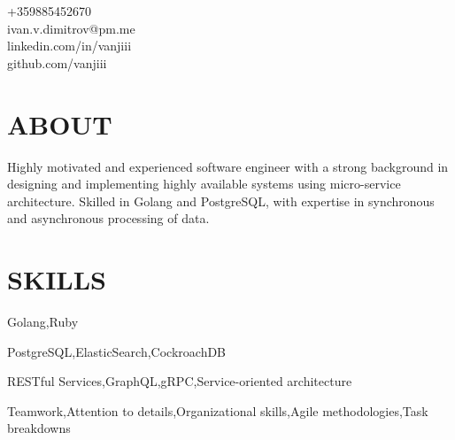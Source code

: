 \documentclass[margin,line]{resume}
\begin{document}
{
    \hfill +359885452670		\vspace{0mm}\\\vspace{0mm}%
    \hfill ivan.v.dimitrov@pm.me        \vspace{0mm}\\\vspace{0mm}%
    \hfill linkedin.com/in/vanjiii      \vspace{0mm}\\\vspace{0mm}%
    \hfill github.com/vanjiii		\vspace{0mm}\\\vspace{-10mm}%
}

\begin{resume}
\vspace{1mm}

\section{\mysidestyle\textbf{\large{A}\small{BOUT}}}

	Highly motivated and experienced software engineer with a strong background
	in designing and implementing highly available systems using micro-service
	architecture. Skilled in Golang and PostgreSQL, with expertise in
	synchronous and asynchronous processing of data.

\sectionline%

    \section{\mysidestyle\textbf{\large{S}\small{KILLS}}}

    \begin{list2}
      \item Golang,\hspace{2mm}Ruby\@
      \item PostgreSQL,\hspace{2mm}ElasticSearch,\hspace{2mm}CockroachDB\@
      \item RESTful Services,\hspace{2mm}GraphQL,\hspace{2mm}gRPC,\hspace{2mm}Service-oriented architecture\@
      \item Teamwork,\hspace{2mm}Attention to details,\hspace{2mm}Organizational skills,\hspace{2mm}Agile methodologies,\hspace{2mm}Task breakdowns\@
    \end{list2}


\end{resume}
\end{document}

